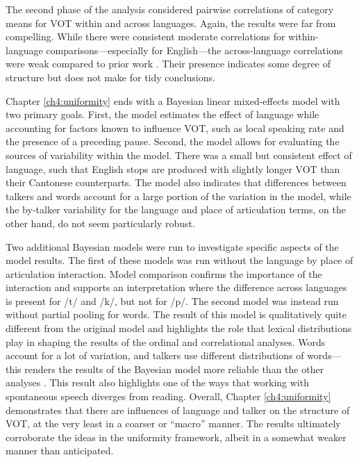 The second phase of the analysis considered pairwise correlations of category means for VOT within and across languages. Again, the results were far from compelling. While there were consistent moderate correlations for within-language comparisons---especially for English---the across-language correlations were weak compared to prior work \citep{chodroff_2017_structure, chodroff_2019_l2}. Their presence indicates some degree of structure but does not make for tidy conclusions. 

Chapter \ref{ch4:uniformity} ends with a Bayesian linear mixed-effects model with two primary goals. First, the model estimates the effect of language while accounting for factors known to influence VOT, such as local speaking rate and the presence of a preceding pause. Second, the model allows for evaluating the sources of variability within the model. There was a small but consistent effect of language, such that English stops are produced with slightly longer VOT than their Cantonese counterparts. The model also indicates that differences between talkers and words account for a large portion of the variation in the model, while the by-talker variability for the language and place of articulation terms, on the other hand, do not seem particularly robust. 

Two additional Bayesian models were run to investigate specific aspects of the model results. The first of these models was run without the language by place of articulation interaction. Model comparison confirms the importance of the interaction and supports an interpretation where the difference across languages is present for /t/ and /k/, but not for /p/. The second model was instead run without partial pooling for words. The result of this model is qualitatively quite different from the original model and highlights the role that lexical distributions play in shaping the results of the ordinal and correlational analyses. Words account for a lot of variation, and talkers use different distributions of words---this renders the results of the Bayesian model more reliable than the other analyses \citep[cf.][]{haines_2020_theoretically}. This result also highlights one of the ways that working with spontaneous speech diverges from reading. Overall, Chapter \ref{ch4:uniformity} demonstrates that there are influences of language and talker on the structure of VOT, at the very least in a coarser or ``macro'' manner. The results ultimately corroborate the ideas in the uniformity framework, albeit in a somewhat weaker manner than anticipated. 

